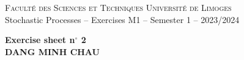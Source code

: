 \documentclass[11pt,a4paper]{article}
\begin{document}
\thispagestyle{empty}
\begin{center}

\textsc{Facult\'e des Sciences et Techniques}  \hfill \textsc{Universit\'e de Limoges} \\
Stochastic Processes -- Exercises \hfill M1 -- Semester 1 -- 2023/2024 \\
\bigskip

{\bf 
\vspace{0.9cm}
Exercise sheet n$^\circ$ 2\\
\vspace{0.2cm}
DANG MINH CHAU
} 
\end{center}
\bigskip

\vspace{0.5cm}


\printbibliography
\end{document}
